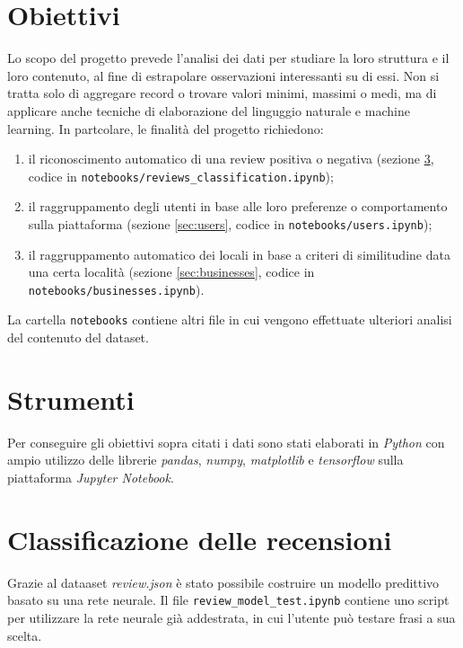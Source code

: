 \documentclass[12pt]{article}
\begin{document}
\section{Obiettivi}
Lo scopo del progetto prevede l'analisi dei dati per studiare la loro struttura e il loro contenuto, al fine di estrapolare osservazioni interessanti su di essi. Non si tratta solo di aggregare record o trovare valori minimi, massimi o medi, ma di applicare anche tecniche di elaborazione del linguggio naturale e machine learning. In partcolare, le finalità del progetto richiedono:
\begin{enumerate}[label=T\arabic*)]
\item il riconoscimento automatico di una review positiva o negativa (sezione \ref{sec:reviews}, codice in \texttt{notebooks/reviews\_classification.ipynb});
\item il raggruppamento degli utenti in base alle loro preferenze o comportamento sulla piattaforma (sezione \ref{sec:users}, codice in \texttt{notebooks/users.ipynb});
\item il raggruppamento automatico dei locali in base a criteri di similitudine data una certa località (sezione \ref{sec:businesses}, codice in \texttt{notebooks/businesses.ipynb}).
\end{enumerate}
La cartella \texttt{notebooks} contiene altri file in cui vengono effettuate ulteriori analisi del contenuto del dataset.


\section{Strumenti}
Per conseguire gli obiettivi sopra citati i dati sono stati elaborati in \textit{Python} con ampio utilizzo delle librerie \textit{pandas}, \textit{numpy}, \textit{matplotlib} e \textit{tensorflow} sulla piattaforma \textit{Jupyter Notebook}.

\section{Classificazione delle recensioni}
\label{sec:reviews}
Grazie al dataaset \textit{review.json} è stato possibile costruire un modello predittivo basato su una rete neurale. \newline
Il file \texttt{review\_model\_test.ipynb} contiene uno script per utilizzare la rete neurale già addestrata, in cui l'utente può testare frasi a sua scelta.
\end{document}
